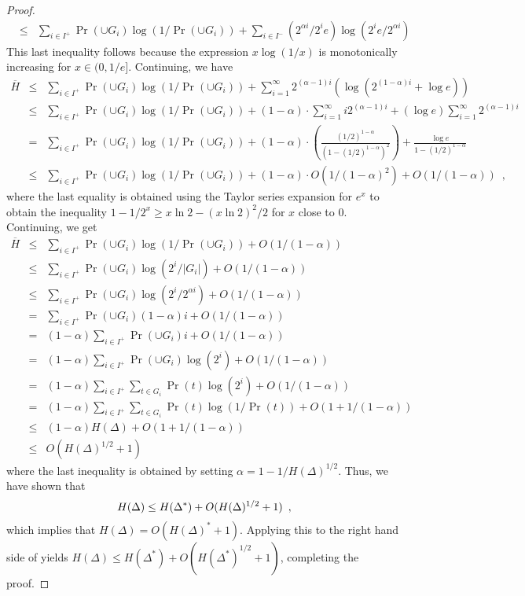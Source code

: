 \documentclass[lotsofwhite]{patmorin}
\begin{document}
\begin{proof}
\begin{eqnarray*}
 & \le & \sum_{i\in I^+}\Pr(\cup G_{i})\log(1/\Pr(\cup G_{i})) 
         + \sum_{i\in I^-}(2^{\alpha i}/2^{i}e)\log(2^{i}e/2^{\alpha i}) 
\end{eqnarray*}
This last inequality follows because the expression $x\log (1/x)$ is
monotonically increasing for $x\in(0,1/e]$.  Continuing, we have
\begin{eqnarray*}
\overline H
   & \le & \sum_{i\in I^+}\Pr(\cup G_{i})\log(1/\Pr(\cup G_{i})) 
         + \sum_{i=1}^\infty 2^{(\alpha-1)i}(\log(2^{(1-\alpha)i}+\log e)) \\
 &  \le  & \sum_{i\in I^+}\Pr(\cup G_{i})\log(1/\Pr(\cup G_{i})) 
         + (1-\alpha)\cdot\sum_{i=1}^\infty i2^{(\alpha-1)i}
         + (\log e) \sum_{i=1}^\infty 2^{(\alpha-1)i} \\
 &  =  & \sum_{i\in I^+}\Pr(\cup G_{i})\log(1/\Pr(\cup G_{i})) 
         + (1-\alpha)\cdot\left(\frac{(1/2)^{1-\alpha}}{(1-(1/2)^{1-\alpha})^2}\right) 
         + \frac{\log e}{1-(1/2)^{1-\alpha}} \\
 & \le & \sum_{i\in I^+}\Pr(\cup G_{i})\log(1/\Pr(\cup G_{i})) 
         + (1-\alpha)\cdot O(1/(1-\alpha)^2) 
         + O(1/(1-\alpha)) \enspace ,
\end{eqnarray*}
where the last equality is obtained using the Taylor series expansion
for $e^{x}$ to obtain the inequality $1-1/2^{x} \ge x\ln 2 - (x\ln 2)^2/2$
for $x$ close to 0.  Continuing, we get 
\begin{eqnarray*}
\overline H
  & \le & \sum_{i\in I^+}\Pr(\cup G_{i})\log(1/\Pr(\cup G_{i})) 
         + O(1/(1-\alpha)) \\
  & \le & \sum_{i\in I^+}\Pr(\cup G_{i})\log(2^i/|G_i|)
         + O(1/(1-\alpha)) \\
  & \le & \sum_{i\in I^+}\Pr(\cup G_{i})\log(2^i/2^{\alpha i})
         + O(1/(1-\alpha)) \\
  &  =  & \sum_{i\in I^+}\Pr(\cup G_{i})(1-\alpha) i
         + O(1/(1-\alpha)) \\
  &  =  & (1-\alpha)\sum_{i\in I^+}\Pr(\cup G_{i}) i
         + O(1/(1-\alpha)) \\
  &  =  & (1-\alpha)\sum_{i\in I^+}\Pr(\cup G_{i})\log(2^i)
         + O(1/(1-\alpha)) \\
  &  =  & (1-\alpha)\sum_{i\in I^+}\sum_{t\in G_i}\Pr(t)\log(2^i)
         + O(1/(1-\alpha)) \\
  &  =  & (1-\alpha)\sum_{i\in I^+}\sum_{t\in G_i}\Pr(t)\log(1/\Pr(t))
         + O(1+1/(1-\alpha)) \\
  & \le & (1-\alpha)H(\Delta) + O(1+1/(1-\alpha)) \\
  & \le &  O(H(\Delta)^{1/2}+ 1)
\end{eqnarray*} 
where the last inequality is obtained by setting 
$\alpha=1-1/H(\Delta)^{1/2}$.  Thus, we have shown that
\begin{equation}
  H(\Delta) \le H(\Delta^*) + O(H(\Delta)^{1/2}+1) \enspace ,
   \eqlabelx{almost-last}
\end{equation}
which implies that $H(\Delta) = O(H(\Delta)^*+1)$.  Applying this to
the right hand side of  yields $H(\Delta) \le
H(\Delta^*) + O(H(\Delta^*)^{1/2} + 1)$, completing the proof.
\end{proof}
\end{document}
